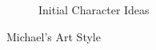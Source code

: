 \begin{figure}[H]
\begin{subfigure}{.45\textwidth}
    \caption{Initial Character Ideas}
    \label{fig:m4}
  \end{subfigure}
  \caption{Michael's Art Style}
  \label{fig:mstyle}
\end{figure}
